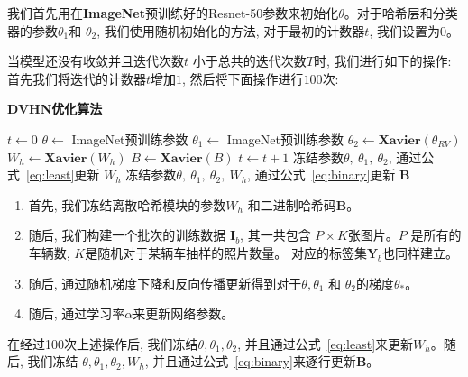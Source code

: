 我们首先用在\textbf{ImageNet}预训练好的Resnet-50参数来初始化$\theta$。对于哈希层和分类器的参数$\theta_1$和 $\theta_2$, 我们使用随机初始化的方法, 对于最初的计数器$t$, 我们设置为$0$。 \par
当模型还没有收敛并且迭代次数$t$ 小于总共的迭代次数$T$时, 我们进行如下的操作: 首先我们将迭代的计数器$t$增加$1$, 然后将下面操作进行$100$次:
\begin{algorithm}
  \caption{\textbf{DVHN优化算法}\label{algo:maindvhn}}
  $t \leftarrow 0$\;
  $\theta \leftarrow $ ImageNet预训练参数 \; 
  $\theta_1 \leftarrow $ ImageNet预训练参数 \; 
  $\theta_2 \leftarrow \textbf{Xavier}(\theta_{RV})$  \; 
  $W_h \leftarrow \textbf{Xavier}(W_h)$  \;
  $B \leftarrow \textbf{Xavier}(B)$  \; 
  {
    $t \leftarrow t +1 $\;
    冻结参数$\theta,~\theta_1,~\theta_2$, 通过公式~\ref{eq:least}更新 $W_h$ \;
    冻结参数$\theta,~\theta_1,~\theta_2,~W_h$, 通过公式~\ref{eq:binary}更新 $\mathbf{B}$ \;
  }
  \end{algorithm}
\begin{enumerate}
    \item 首先, 我们冻结离散哈希模块的参数$W_h$ 和二进制哈希码$\mathbf{B}$。
    \item 随后, 我们构建一个批次的训练数据 $\mathbf{I}_b$, 其一共包含 $P \times K$张图片。$P$ 是所有的车辆数, $K$是随机对于某辆车抽样的照片数量。 对应的标签集$\mathbf{Y}_b$也同样建立。
    \item 随后, 通过随机梯度下降和反向传播更新得到对于$\theta, \theta_1$ 和 $\theta_2$的梯度$\theta_*$。
    \item 随后, 通过学习率$\alpha$来更新网络参数。
\end{enumerate}
在经过100次上述操作后, 我们冻结$\theta, \theta_1, \theta_2$, 并且通过公式~\ref{eq:least}来更新$W_h$。随后, 我们冻结 $\theta, \theta_1, \theta_2, W_h$, 并且通过公式~\ref{eq:binary}来逐行更新$\mathbf{B}$。

